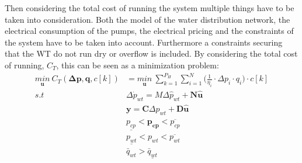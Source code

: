 Then considering the total cost of running the system multiple things have to be taken into consideration. Both the model of the water distribution network, the electrical consumption of the pumps, the electrical pricing and the constraints of the system have to be taken into account. Furthermore a constraints securing that the WT do not run dry or overflow is included. By considering the total cost of running, $C_T$, this can be seen as a minimization problem:
\begin{align}
\underset{\pmb{u}}{min} \: C_T(\pmb{\Delta{p}},\pmb{q},c[k]) &= \underset{\pmb{u}}{min} \: \sum_{k=1}^{P_H} \sum_{i=1}^{N} \Big(\frac{1}{\eta_i}\cdot\Delta{p}_i\cdot q_i\Big) \cdot c[k] \label{eqcost} \\
%
s.t \:\:\:\:\: & \Delta \dot{p}_{wt} = M \Delta \hat{p}_{wt}  + \pmb{N}\pmb{\hat{u}} \\
%
&\pmb{y} = \pmb{C} \Delta \hat{p}_{wt}  + \pmb{D}\pmb{\hat{u}} \\
%
& \underline{p_{cp}} < \pmb{p_{cp}} < \overline{p_{cp}} \\
%
& \underline{p_{wt}} < p_{wt} < \overline{p_{wt}} \\
%
& \bar{q}_{wt} > \underline{\bar{q}_{wt}} \label{eqconst} 
\end{align}

